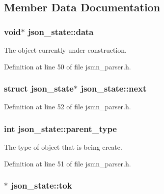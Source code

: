 \subsection{Member Data Documentation}
\hypertarget{structjson__state_acc079826c9aec290370460c6a5b0cdc8}{
\subsubsection[{data}]{\setlength{\rightskip}{0pt plus 5cm}void$\ast$ json\-\_\-state\-::data}}\label{structjson__state_acc079826c9aec290370460c6a5b0cdc8}


The object currently under construction. 



Definition at line 50 of file jsmn\-\_\-parser.\-h.

\hypertarget{structjson__state_a62a49f4c9101a8e5a93a757c74060b25}{
\subsubsection[{next}]{\setlength{\rightskip}{0pt plus 5cm}struct {\bf json\-\_\-state}$\ast$ json\-\_\-state\-::next}}\label{structjson__state_a62a49f4c9101a8e5a93a757c74060b25}


Definition at line 52 of file jsmn\-\_\-parser.\-h.

\hypertarget{structjson__state_a89afcce72accc1241265f843ec7d6f40}{
\subsubsection[{parent\-\_\-type}]{\setlength{\rightskip}{0pt plus 5cm}int json\-\_\-state\-::parent\-\_\-type}}\label{structjson__state_a89afcce72accc1241265f843ec7d6f40}


The type of object that is being create. 



Definition at line 51 of file jsmn\-\_\-parser.\-h.

\hypertarget{structjson__state_a4b6bd5d26604be1ca0783f1b36c01a9f}{
\subsubsection[{tok}]{$\ast$ json\-\_\-state\-::tok}}\label{structjson__state_a4b6bd5d26604be1ca0783f1b36c01a9f}


